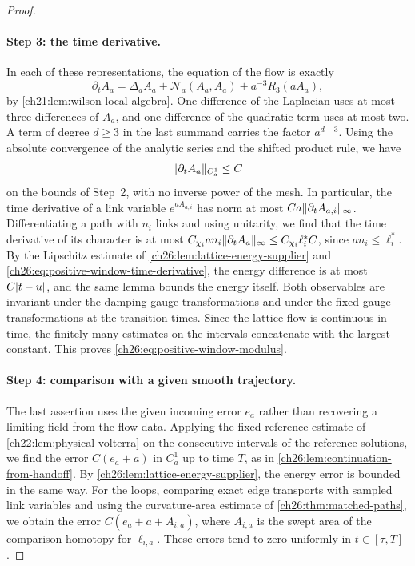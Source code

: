 \begin{proof}
\paragraph{Step 3: the time derivative.}
In each of these representations, the equation of the flow is exactly
\[
 \partial_tA_a=\Delta_aA_a+\mathcal N_a(A_a,A_a)+a^{-3}R_3(aA_a),
\]
by \cref{ch21:lem:wilson-local-algebra}. One difference of the Laplacian uses at most three differences of $A_a$, and one difference of the quadratic term uses at most two. A term of degree $d\ge3$ in the last summand carries the factor $a^{d-3}$. Using the absolute convergence of the analytic series and the shifted product rule, we have
\begin{equation}\label{ch26:eq:positive-window-time-derivative}
 \lVert \partial_tA_a\rVert_{C_a^1}\le C
\end{equation}
on the bounds of Step~2, with no inverse power of the mesh. In particular, the time derivative of a link variable $e^{aA_{a,i}}$ has norm at most $Ca\lVert \partial_tA_{a,i}\rVert_\infty$. Differentiating a path with $n_i$ links and using unitarity, we find that the time derivative of its character is at most $C_{\chi_i}an_i\lVert \partial_tA_a\rVert_\infty\le C_{\chi_i}\ell_i^*C$, since $an_i\le\ell_i^*$. By the Lipschitz estimate of \cref{ch26:lem:lattice-energy-supplier} and \eqref{ch26:eq:positive-window-time-derivative}, the energy difference is at most $C\lvert t-u\rvert$, and the same lemma bounds the energy itself. Both observables are invariant under the damping gauge transformations and under the fixed gauge transformations at the transition times. Since the lattice flow is continuous in time, the finitely many estimates on the intervals concatenate with the largest constant. This proves \eqref{ch26:eq:positive-window-modulus}.

\paragraph{Step 4: comparison with a given smooth trajectory.}
The last assertion uses the given incoming error $e_a$ rather than recovering a limiting field from the flow data. Applying the fixed-reference estimate of \cref{ch22:lem:physical-volterra} on the consecutive intervals of the reference solutions, we find the error $C(e_a+a)$ in $C_a^1$ up to time $T$, as in \cref{ch26:lem:continuation-from-handoff}. By \cref{ch26:lem:lattice-energy-supplier}, the energy error is bounded in the same way. For the loops, comparing exact edge transports with sampled link variables and using the curvature-area estimate of \cref{ch26:thm:matched-paths}, we obtain the error $C(e_a+a+A_{i,a})$, where $A_{i,a}$ is the swept area of the comparison homotopy for $\ell_{i,a}$. These errors tend to zero uniformly in $t\in[\tau,T]$.
\end{proof}

